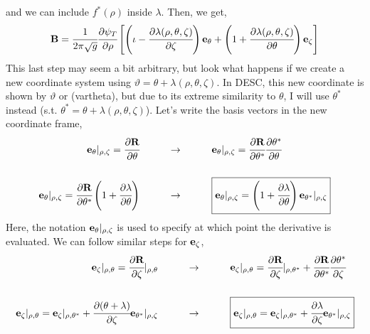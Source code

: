 and we can include $f^*(\rho)$ inside $\lambda$. Then, we get,
\begin{equation}
    \mathbf{B} = \cfrac{1}{2\pi\sqrt{g}}\cfrac{\partial \psi_{T}}{\partial \rho}\begin{bmatrix}
        \left(\iota - \cfrac{\partial\lambda(\rho,\theta,\zeta)}{\partial\zeta}\right)\mathbf{e}_\theta  +
        \left(1 + \cfrac{\partial\lambda(\rho,\theta,\zeta)}{\partial\theta}\right) \mathbf{e}_\zeta
    \end{bmatrix}  \label{mag_theta}  
\end{equation}
This last step may seem a bit arbitrary, but look what happens if we create a new coordinate system using $\vartheta = \theta + \lambda(\rho, \theta, \zeta)$. In DESC, this new coordinate is shown by $\vartheta$ or (vartheta), but due to its extreme similarity to $\theta$, I will use $\theta^*$ instead (s.t. $\theta^* = \theta + \lambda(\rho, \theta, \zeta)$). Let's write the basis vectors in the new coordinate frame,
\begin{align}
    \mathbf{e}_\theta|_{\rho,\zeta} = \cfrac{\partial \mathbf{R}}{\partial \theta} \hspace{1cm}&\rightarrow \hspace{1cm} \mathbf{e}_{\theta}|_{\rho,\zeta} = \cfrac{\partial \mathbf{R}}{\partial \theta^*}\cfrac{\partial \theta^*}{\partial \theta}  \\[.5cm]
    \mathbf{e}_{\theta}|_{\rho,\zeta} = \cfrac{\partial \mathbf{R}}{\partial \theta^*}\left(1+\cfrac{\partial \lambda}{\partial \theta}\right)\hspace{1cm}&\rightarrow \hspace{1cm} \boxed{\mathbf{e}_{\theta}|_{\rho,\zeta} = \left(1+\cfrac{\partial \lambda}{\partial \theta}\right)\mathbf{e}_{\theta^*}|_{\rho,\zeta}} \label{e_theta2star}
\end{align}
Here, the notation $\mathbf{e}_\theta|_{\rho,\zeta}$ is used to specify at which point the derivative is evaluated. We can follow similar steps for $\mathbf{e}_\zeta$,
\begin{align}
    \mathbf{e}_\zeta|_{\rho,\theta} = \cfrac{\partial \mathbf{R}}{\partial \zeta}|_{\rho,\theta} \hspace{1cm} &\rightarrow \hspace{1cm} 
    \mathbf{e}_\zeta|_{\rho,\theta} = \cfrac{\partial \mathbf{R}}{\partial \zeta}|_{\rho,\theta^*} + \cfrac{\partial \mathbf{R}}{\partial \theta^*}\cfrac{\partial \theta^*}{\partial \zeta} \\[.5cm]
    \mathbf{e}_{\zeta}|_{\rho,\theta} = \mathbf{e}_\zeta |_{\rho,\theta^*} + \cfrac{\partial (\theta + \lambda)}{\partial\zeta}\mathbf{e}_{\theta^*} |_{\rho,\zeta} 
    \hspace{1cm} &\rightarrow \hspace{1cm} \boxed{\mathbf{e}_\zeta |_{\rho,\theta} = \mathbf{e}_\zeta |_{\rho,\theta^*} + \cfrac{\partial \lambda}{\partial \zeta} \mathbf{e}_{\theta^*} |_{\rho,\zeta}}  \label{e_zeta2star}
\end{align}
